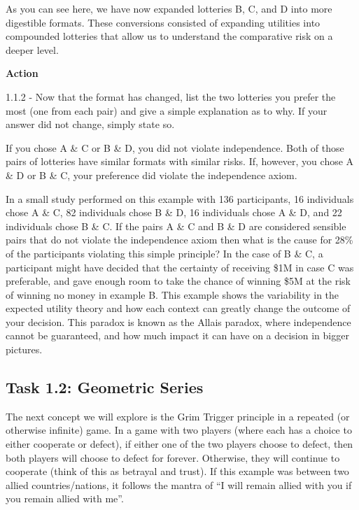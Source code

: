 \documentclass[letterpaper,12pt]{report}
\begin{document}
As you can see here, we have now expanded lotteries B, C, and D into more digestible formats. These  conversions consisted of expanding utilities into compounded lotteries that allow us to understand the comparative risk on a deeper level.

\bigskip
\begin{mdframed}[backgroundcolor=blue!10,style=code,nobreak=true,align=center,userdefinedwidth=14cm]
    \textbf{Action}
    \bigskip 
    
    1.1.2 - Now that the format has changed, list the two lotteries you prefer the most (one from each pair) and give a simple explanation as to why. If your answer did not change, simply state so.
\end{mdframed}

\newpage

If you chose A \& C or B \& D, you did not violate independence. Both of those pairs of lotteries have similar formats with similar risks. If, however, you chose A \& D or B \& C, your preference did violate the independence axiom.

In a small study performed on this example with 136 participants, 16 individuals chose A \& C, 82 individuals chose B \& D, 16 individuals chose A \& D, and 22 individuals chose B \& C. If the pairs A \& C and B \& D are considered sensible pairs that do not violate the independence axiom then what is the cause for 28\% of the participants violating this simple principle? In the case of B \& C, a participant might have decided that the certainty of receiving \$1M in case C was preferable, and gave enough room to take the chance of winning \$5M at the risk of winning no money in example B. This example shows the variability in the expected utility theory and how each context can greatly change the outcome of your decision. This paradox is known as the Allais paradox, where independence cannot be guaranteed, and how much impact it can have on a decision in bigger pictures. 

\subsection*{Task 1.2: Geometric Series}

The next concept we will explore is the Grim Trigger principle in a repeated (or otherwise infinite) game. In a game with two players (where each has a choice to either cooperate or defect), if either one of the two players choose to defect, then both players will choose to defect for forever. Otherwise, they will continue to cooperate (think of this as betrayal and trust). If this example was between two allied countries/nations, it follows the mantra of “I will remain allied with you if you remain allied with me”.
\end{document}
